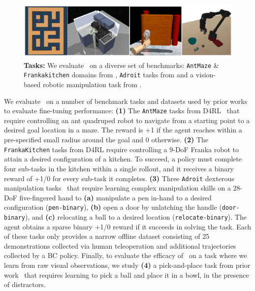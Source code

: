 \begin{figure}
\centering
\vspace{-0.45cm}
\includegraphics[width=0.99\linewidth]{chapters/cal_ql/figs-sample/envs_final.pdf}
\vspace{-0.45cm}
\caption{
\footnotesize{\textbf{Tasks:} We evaluate \methodname\ on a diverse set of benchmarks: \texttt{AntMaze} \& \texttt{Frankakitchen} domains from \cite{fu2020d4rl}, \texttt{Adroit} tasks from \cite{nair2020accelerating} and a vision-based robotic manipulation task from \cite{kumar2022pre}.}}
\label{fig:envs}
\vspace{-0.6cm}
\end{figure}
 We evaluate \methodname\ on a number of benchmark tasks and datasets used by prior works~\cite{kostrikov2021offlineb,nair2020accelerating} to evaluate fine-tuning performance: \textbf{(1)} The {\texttt{AntMaze}} tasks from D4RL~\cite{fu2020d4rl} that require controlling an ant quadruped robot to navigate from a starting point to a desired goal location in a maze. The reward is +1 if the agent reaches within a pre-specified small radius around the goal and 0 otherwise. 
\textbf{(2)} The \texttt{FrankaKitchen} tasks from D4RL require controlling a 9-DoF Franka robot to attain a desired configuration of a kitchen. To succeed, a policy 
must complete four sub-tasks in the kitchen within a single rollout, and it receives a binary reward of +1/0 for every sub-task it completes. \textbf{(3)} Three \texttt{Adroit} dexterous manipulation tasks~\cite{rajeswaran2018dapg,kostrikov2021offlineb,nair2020accelerating} that require learning complex manipulation skills on a 28-DoF five-fingered hand to \textbf{(a)} manipulate a pen in-hand to a desired configuration (\texttt{pen-binary}), \textbf{(b)} open a door by unlatching the handle (\texttt{door-binary}), and \textbf{(c)} relocating a ball to a desired location (\texttt{relocate-binary}). The agent obtains a sparse binary +1/0 reward if it succeeds in solving the task. Each of these tasks only provides a narrow offline dataset consisting of 25 demonstrations collected via human teleoperation and additional trajectories collected by a BC policy.
Finally, to evaluate the efficacy of \methodname\ on a task where we learn from raw visual observations, we study \textbf{(4)} a pick-and-place task from prior work~\cite{singh2020cog,kumar2022pre} that requires learning to pick a ball and place it in a bowl, in the presence of distractors.


